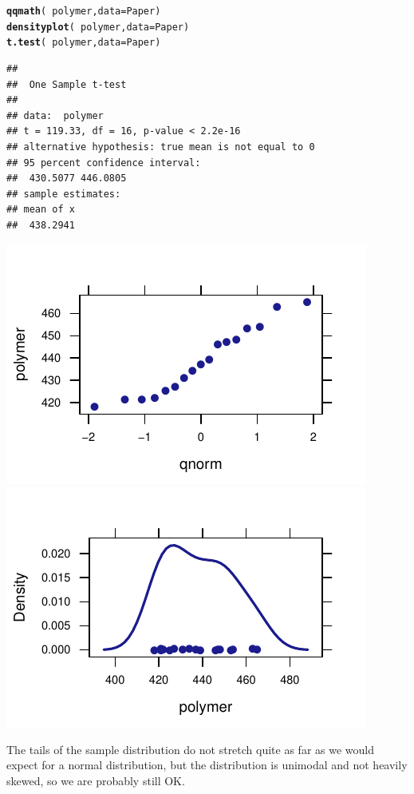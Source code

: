 \documentclass[twoside]{book}\usepackage[]{graphicx}\usepackage[]{xcolor}
\makeatletter
\def\maxwidth{ %
  \ifdim\Gin@nat@width>\linewidth
    \linewidth
  \else
    \Gin@nat@width
  \fi
}
\newcommand{\hlopt}[1]{\textcolor[rgb]{0,0,0}{#1}}%
\newcommand{\hlstd}[1]{\textcolor[rgb]{0.345,0.345,0.345}{#1}}%
\newcommand{\hlkwc}[1]{\textcolor[rgb]{0.333,0.667,0.333}{#1}}%
\newcommand{\hlkwd}[1]{\textcolor[rgb]{0.737,0.353,0.396}{\textbf{#1}}}%
\newenvironment{kframe}{%
 \def\at@end@of@kframe{}%
 \ifinner\ifhmode%
  \def\at@end@of@kframe{\end{minipage}}%
  \begin{minipage}{\columnwidth}%
 \fi\fi%
 \def\FrameCommand##1{\hskip\@totalleftmargin \hskip-\fboxsep
 \colorbox{shadecolor}{##1}\hskip-\fboxsep
     \hskip-\linewidth \hskip-\@totalleftmargin \hskip\columnwidth}%
 \MakeFramed {\advance\hsize-\width
   \@totalleftmargin\z@ \linewidth\hsize
   \@setminipage}}%
 {\par\unskip\endMakeFramed%
 \at@end@of@kframe}
\newenvironment{knitrout}{}{} %
\makeatother
\begin{document}
\begin{solution}
\begin{knitrout}
\color{fgcolor}\begin{kframe}
\begin{alltt}
\hlkwd{qqmath}\hlstd{(} \hlopt{~} \hlstd{polymer,} \hlkwc{data}\hlstd{=Paper )}
\hlkwd{densityplot}\hlstd{(} \hlopt{~} \hlstd{polymer,} \hlkwc{data}\hlstd{=Paper )}
\hlkwd{t.test}\hlstd{(} \hlopt{~}\hlstd{polymer,} \hlkwc{data}\hlstd{=Paper )}
\end{alltt}
\begin{verbatim}
## 
## 	One Sample t-test
## 
## data:  polymer
## t = 119.33, df = 16, p-value < 2.2e-16
## alternative hypothesis: true mean is not equal to 0
## 95 percent confidence interval:
##  430.5077 446.0805
## sample estimates:
## mean of x 
##  438.2941
\end{verbatim}
\end{kframe}

{\centering \includegraphics[width=\maxwidth]{figures/fig-unnamed-chunk-156-1} 
\includegraphics[width=\maxwidth]{figures/fig-unnamed-chunk-156-2} 

}



\end{knitrout}
The tails of the sample distribution do not stretch quite as far as we would expect 
for a normal distribution, but the distribution is unimodal and not heavily skewed,
so we are probably still OK.
\end{solution}
\end{document}
